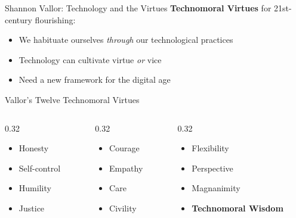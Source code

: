 \documentclass[aspectratio=169]{beamer}
\begin{document}
\begin{frame}{Shannon Vallor: Technology and the Virtues}
\textbf{Technomoral Virtues} for 21st-century flourishing:

\begin{itemize}
    \item We habituate ourselves \textit{through} our technological practices
    \item Technology can cultivate virtue \textit{or} vice
    \item Need a new framework for the digital age
\end{itemize}

\vspace{0.2cm}
\begin{block}{Vallor's Twelve Technomoral Virtues}
\begin{columns}[T]
\begin{column}{0.32\textwidth}
\small
\begin{itemize}
    \item Honesty
    \item Self-control
    \item Humility
    \item Justice
\end{itemize}
\end{column}
\begin{column}{0.32\textwidth}
\small
\begin{itemize}
    \item Courage
    \item Empathy
    \item Care
    \item Civility
\end{itemize}
\end{column}
\begin{column}{0.32\textwidth}
\small
\begin{itemize}
    \item Flexibility
    \item Perspective
    \item Magnanimity
    \item \textbf{Technomoral Wisdom}
\end{itemize}
\end{column}
\end{columns}
\end{block}
\end{frame}

\end{document}
